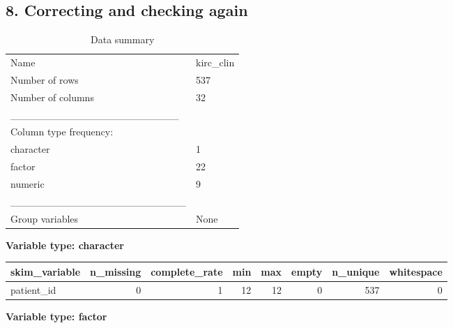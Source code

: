 \documentclass[]{article}
\newenvironment{Shaded}{\begin{snugshade}}{\end{snugshade}}
\newcommand{\KeywordTok}[1]{\textcolor[rgb]{0.13,0.29,0.53}{\textbf{#1}}}
\newcommand{\FloatTok}[1]{\textcolor[rgb]{0.00,0.00,0.81}{#1}}
\newcommand{\StringTok}[1]{\textcolor[rgb]{0.31,0.60,0.02}{#1}}
\newcommand{\CommentTok}[1]{\textcolor[rgb]{0.56,0.35,0.01}{\textit{#1}}}
\newcommand{\OperatorTok}[1]{\textcolor[rgb]{0.81,0.36,0.00}{\textbf{#1}}}
\newcommand{\NormalTok}[1]{#1}
\begin{document}
\subsection{8. Correcting and checking
again}\label{correcting-and-checking-again}

\begin{Shaded}
\end{Shaded}

\begin{longtable}[]{@{}ll@{}}
\caption{Data summary}\tabularnewline
\toprule
Name & kirc\_clin\tabularnewline
Number of rows & 537\tabularnewline
Number of columns & 32\tabularnewline
\_\_\_\_\_\_\_\_\_\_\_\_\_\_\_\_\_\_\_\_\_\_\_ &\tabularnewline
Column type frequency: &\tabularnewline
character & 1\tabularnewline
factor & 22\tabularnewline
numeric & 9\tabularnewline
\_\_\_\_\_\_\_\_\_\_\_\_\_\_\_\_\_\_\_\_\_\_\_\_ &\tabularnewline
Group variables & None\tabularnewline
\bottomrule
\end{longtable}

\textbf{Variable type: character}

\begin{longtable}[]{@{}lrrrrrrr@{}}
\toprule
skim\_variable & n\_missing & complete\_rate & min & max & empty &
n\_unique & whitespace\tabularnewline
\midrule
\endhead
patient\_id & 0 & 1 & 12 & 12 & 0 & 537 & 0\tabularnewline
\bottomrule
\end{longtable}

\textbf{Variable type: factor}
\end{document}
